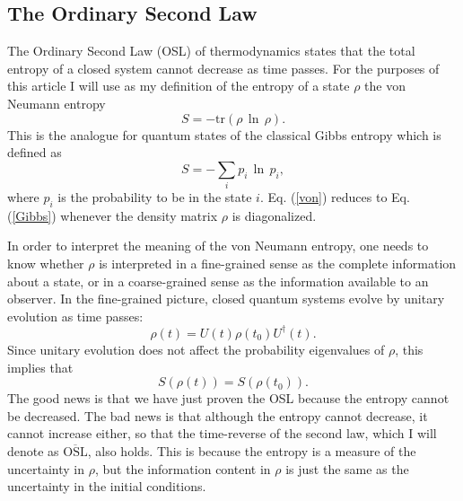 \documentclass[12pt]{article}
\begin{document}
\subsection{The Ordinary Second Law}\label{OSL}

The Ordinary Second Law (OSL) of thermodynamics states that the total entropy of a closed system cannot decrease as time passes.  For the purposes of this article I will use as my definition of the entropy of a state $\rho$ the von Neumann entropy
\begin{equation}\label{von}
S = -\mathrm{tr}(\rho\,\ln\,\rho).
\end{equation}
This is the analogue for quantum states of the classical Gibbs entropy which is defined as
\begin{equation}\label{Gibbs}
S = -\sum_i p_i\,\ln\,p_i,
\end{equation}
where $p_i$ is the probability to be in the state $i$.  Eq. (\ref{von}) reduces to Eq. (\ref{Gibbs}) whenever the density matrix $\rho$ is diagonalized.

In order to interpret the meaning of the von Neumann entropy, one needs to know whether $\rho$ is interpreted in a fine-grained sense as the complete information about a state, or in a coarse-grained sense as the information available to an observer.  In the fine-grained picture, closed quantum systems evolve by unitary evolution as time passes:
\begin{equation}\label{unitary}
\rho(t) = U(t) \rho(t_0) U^\dagger(t).
\end{equation}
Since unitary evolution does not affect the probability eigenvalues of $\rho$, this implies that
\begin{equation}
S(\rho(t)) = S(\rho(t_0)).
\end{equation}
The good news is that we have just proven the OSL because the entropy cannot be decreased.  The bad news is that although the entropy cannot decrease, it cannot increase either, so that the time-reverse of the second law, which I will denote as $\overline{\mathrm{OSL}}$, also holds.  This is because the entropy is a measure of the uncertainty in $\rho$, but the information content in $\rho$ is just the same as the uncertainty in the initial conditions.
\end{document}
